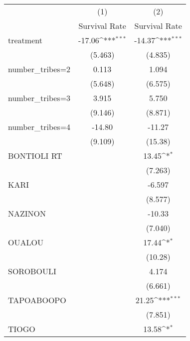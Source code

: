 {
\def\sym#1{\ifmmode^{#1}\else\(^{#1}\)\fi}
\begin{tabular}{l*{2}{c}}
\hline\hline
                    &\multicolumn{1}{c}{(1)}&\multicolumn{1}{c}{(2)}\\
                    &\multicolumn{1}{c}{Survival Rate}&\multicolumn{1}{c}{Survival Rate}\\
\hline
treatment           &      -17.06\sym{***}&      -14.37\sym{***}\\
                    &     (5.463)         &     (4.835)         \\
[1em]
number\_tribes=2     &       0.113         &       1.094         \\
                    &     (5.648)         &     (6.575)         \\
[1em]
number\_tribes=3     &       3.915         &       5.750         \\
                    &     (9.146)         &     (8.871)         \\
[1em]
number\_tribes=4     &      -14.80         &      -11.27         \\
                    &     (9.109)         &     (15.38)         \\
[1em]
BONTIOLI RT         &                     &       13.45\sym{*}  \\
                    &                     &     (7.263)         \\
[1em]
KARI                &                     &      -6.597         \\
                    &                     &     (8.577)         \\
[1em]
NAZINON             &                     &      -10.33         \\
                    &                     &     (7.040)         \\
[1em]
OUALOU              &                     &       17.44\sym{*}  \\
                    &                     &     (10.28)         \\
[1em]
SOROBOULI           &                     &       4.174         \\
                    &                     &     (6.661)         \\
[1em]
TAPOABOOPO          &                     &       21.25\sym{***}\\
                    &                     &     (7.851)         \\
[1em]
TIOGO               &                     &       13.58\sym{*}  \\

\end{tabular}}
